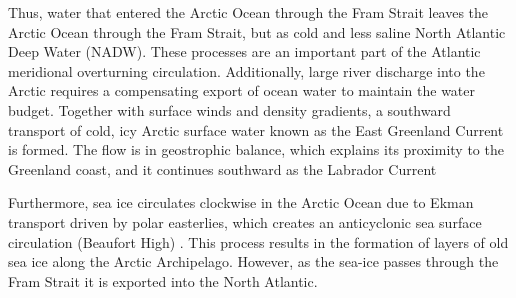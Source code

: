 Thus, water that entered the Arctic Ocean through the Fram Strait leaves the Arctic Ocean through the Fram Strait, but as cold and less saline North Atlantic Deep Water (NADW). These processes are an important part of the Atlantic meridional overturning circulation. Additionally, large river discharge into the Arctic requires a compensating export of ocean water to maintain the water budget. Together with surface winds and density gradients, a southward transport of cold, icy Arctic surface water known as the East Greenland Current is formed. The flow is in geostrophic balance, which explains its proximity to the Greenland coast, and it continues southward as the Labrador Current \citep{serreze2014}

Furthermore, sea ice circulates clockwise in the Arctic Ocean due to Ekman transport driven by polar easterlies, which creates an anticyclonic sea surface circulation (Beaufort High) \citep{serreze2014}. This process results in the formation of layers of old sea ice along the Arctic Archipelago. However, as the sea-ice passes through the Fram Strait it is exported into the North Atlantic.
